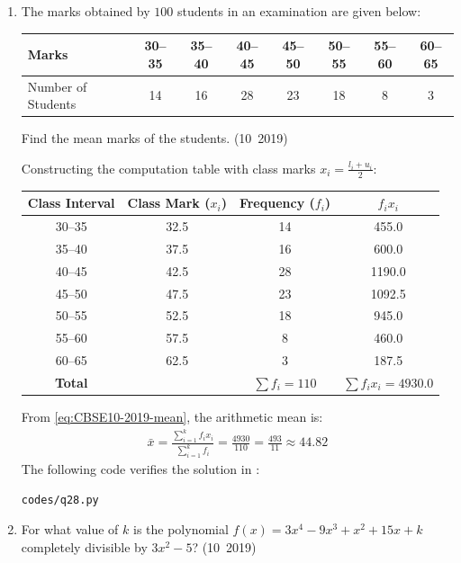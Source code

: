 \begin{enumerate}[label=\thesubsection.\arabic*, ref=\thesubsection.\theenumi]
	\item The marks obtained by $100$ students in an examination are given below:
	\begin{center}
		\begin{tabular}{|l|c|c|c|c|c|c|c|}
			\hline
			Marks & 30--35 & 35--40 & 40--45 & 45--50 & 50--55 & 55--60 & 60--65\\
			\hline
			Number of Students & 14 & 16 & 28 & 23 & 18 & 8 & 3\\
			\hline
		\end{tabular}
	\end{center}
	Find the mean marks of the students.
	\hfill (10~2019)
	
	\solution
	Constructing the computation table with class marks $x_i = \frac{l_i + u_i}{2}$:
	\begin{center}
		\begin{tabular}{|c|c|c|c|}
			\hline
			Class Interval & Class Mark ($x_i$) & Frequency ($f_i$) & $f_i x_i$ \\
			\hline
			30--35 & 32.5 & 14 & 455.0 \\
			35--40 & 37.5 & 16 & 600.0 \\
			40--45 & 42.5 & 28 & 1190.0 \\
			45--50 & 47.5 & 23 & 1092.5 \\
			50--55 & 52.5 & 18 & 945.0 \\
			55--60 & 57.5 & 8  & 460.0 \\
			60--65 & 62.5 & 3  & 187.5 \\
			\hline
			\textbf{Total} & & $\sum f_i = 110$ & $\sum f_i x_i = 4930.0$ \\
			\hline
		\end{tabular}
	\end{center}
	From \eqref{eq:CBSE10-2019-mean}, the arithmetic mean is:
	\begin{align}
		\bar{x} = \frac{\sum_{i=1}^k f_i x_i}{\sum_{i=1}^k f_i} = \frac{4930}{110} = \frac{493}{11} \approx 44.82
	\end{align}
	The following code verifies the solution in :
	\begin{lstlisting}[frame=single, basicstyle=\ttfamily\small]
		codes/q28.py
	\end{lstlisting}

	
	\item For what value of $k$ is the polynomial $f(x)=3x^4-9x^3+x^2+15x+k$ completely divisible by $3x^2-5$?
	\hfill (10~2019)
	

\end{enumerate}
